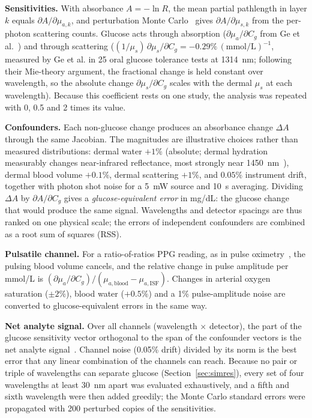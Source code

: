 \documentclass[11pt]{article}
\newcommand{\mgdl}{mg/dL}
\begin{document}
\textbf{Sensitivities.} With absorbance $A = -\ln R$, the mean partial pathlength in layer $k$ equals $\partial A/\partial\mu_{a,k}$, and perturbation Monte Carlo~\citep{hayakawa2001} gives $\partial A/\partial\mu_{s,k}$ from the per-photon scattering counts. Glucose acts through absorption ($\partial\mu_a/\partial C_g$ from Ge et al.~\citep{ge2024}) and through scattering ($(1/\mu_s)\,\partial\mu_s/\partial C_g = -0.29\%\,(\mathrm{mmol/L})^{-1}$, measured by Ge et al. in 25 oral glucose tolerance tests at 1314~nm; following their Mie-theory argument, the fractional change is held constant over wavelength, so the absolute change $\partial\mu_s/\partial C_g$ scales with the dermal $\mu_s$ at each wavelength). Because this coefficient rests on one study, the analysis was repeated with 0, 0.5 and 2 times its value.

\textbf{Confounders.} Each non-glucose change produces an absorbance change $\Delta A$ through the same Jacobian. The magnitudes are illustrative choices rather than measured distributions: dermal water $+1\%$ (absolute; dermal hydration measurably changes near-infrared reflectance, most strongly near 1450~nm~\citep{mamouei2021}), dermal blood volume $+0.1\%$, dermal scattering $+1\%$, and $0.05\%$ instrument drift, together with photon shot noise for a 5~mW source and 10~s averaging. Dividing $\Delta A$ by $\partial A/\partial C_g$ gives a \emph{glucose-equivalent error} in \mgdl{}: the glucose change that would produce the same signal. Wavelengths and detector spacings are thus ranked on one physical scale; the errors of independent confounders are combined as a root sum of squares (RSS).

\textbf{Pulsatile channel.} For a ratio-of-ratios PPG reading, as in pulse oximetry~\citep{jubran2015}, the pulsing blood volume cancels, and the relative change in pulse amplitude per mmol/L is $(\partial\mu_a/\partial C_g)/(\mu_{a,\mathrm{blood}}-\mu_{a,\mathrm{ISF}})$. Changes in arterial oxygen saturation ($\pm2\%$), blood water ($+0.5\%$) and a 1\% pulse-amplitude noise are converted to glucose-equivalent errors in the same way.

\textbf{Net analyte signal.} Over all channels (wavelength $\times$ detector), the part of the glucose sensitivity vector orthogonal to the span of the confounder vectors is the net analyte signal~\citep{lorber1986}. Channel noise (0.05\% drift) divided by its norm is the best error that any linear combination of the channels can reach. Because no pair or triple of wavelengths can separate glucose (Section~\ref{sec:simres}), every set of four wavelengths at least 30~nm apart was evaluated exhaustively, and a fifth and sixth wavelength were then added greedily; the Monte Carlo standard errors were propagated with 200 perturbed copies of the sensitivities.
\end{document}
